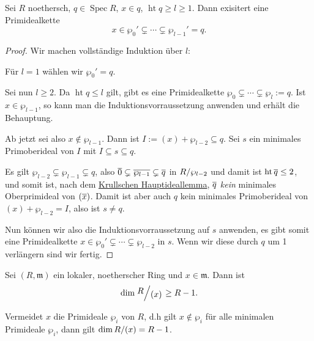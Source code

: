 \documentclass[a4paper,12pt,index=toc]{scrbook}
\theoremstyle{keinenummern} %
\def\m{\mathfrak{m}}
\newcommand{\hoehe}{\operatorname{ht}}
\newcommand{\Spec}{\operatorname{Spec}}
\def\Bar#1{\ensuremath\overline{#1}}
\begin{document}
\begin{lem}\label{3.5.1}
Sei $R$ noethersch, $q \in \Spec R$, $x\in q$, $\hoehe q \ge l \ge 1$. Dann exisitert eine Primidealkette
\[x\in \wp_0'\subsetneq\dotsm \subsetneq \wp_{l-1}'=q.\]
\end{lem}
\begin{proof} Wir machen vollständige Induktion über $l$:

Für $l=1$ wählen wir $\wp_0'=q$.

Sei nun $l\ge 2$. Da $\hoehe q\le l$ gilt, gibt es eine Primidealkette $\wp_0\subsetneq\dotsm\subsetneq \wp_l:=q$. Ist $x \in \wp_{l-1}$, so kann man die Induktionsvorraussetzung anwenden und erhält die Behauptung.

Ab jetzt sei also $x\notin \wp_{l-1}$. Dann ist $I:=(x) + \wp_{l-2}\subseteq q$. Sei $s$ ein minimales Primoberideal von $I$ mit $I\subseteq s\subseteq q$.

Es gilt $\wp_{l-2}\subsetneq \wp_{l-1}\subsetneq q$, also $\Bar{0}\subsetneq\Bar{\wp_{l-1}}\subsetneq \Bar{q}$ in $\Quotient{R}{\wp_{l-2}}$ und damit ist $\hoehe \Bar{q}\le 2$, und somit ist, nach dem \hyperref[khil]{Krullschen Hauptideallemma}, $\Bar{q}$ \textit{kein} minimales Oberprimideal von $(\Bar{x})$. Damit ist aber auch $q$ kein minimales Primoberideal von $(x)+\wp_{l-2}=I$, also ist $s\neq q$.

Nun können wir also die Induktionsvorraussetzung auf $s$ anwenden, es gibt somit eine Primidealkette $x\in \wp_0'\subsetneq \dotsm\subsetneq \wp_{l-2}$ in $s$. Wenn wir diese durch $q$ um 1 verlängern sind wir fertig.
\end{proof}

\begin{kor}\label{3.5.2}
Sei $(R,\m)$ ein lokaler, noetherscher Ring und $x\in \m$. Dann ist \[\dim \Quotient{R}{(x)}\ge R-1.\]

Vermeidet $x$ die Primideale $\wp_i$ von $R$, d.h gilt $x\notin \wp_i$ für alle minimalen Primideale $\wp_i$, dann gilt $\dim \Quotient{R}{(x)}=R-1$.
\end{kor}
\end{document}

